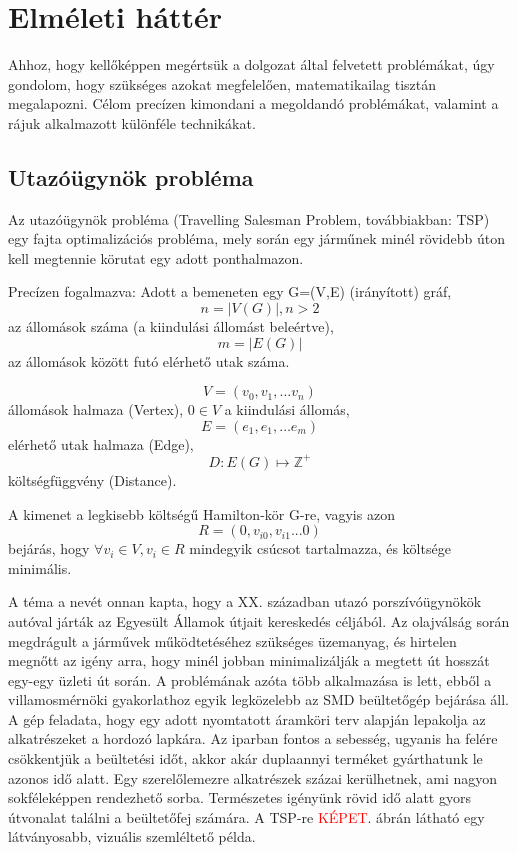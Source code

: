 \chapter{Elméleti háttér}

Ahhoz, hogy kellőképpen megértsük a dolgozat által felvetett problémákat, úgy gondolom, hogy szükséges azokat megfelelően, matematikailag tisztán megalapozni. Célom precízen kimondani a megoldandó problémákat, valamint a rájuk alkalmazott különféle technikákat.

\section{Utazóügynök probléma \cite{alg_optim}}
Az utazóügynök probléma (Travelling Salesman Problem, továbbiakban: TSP)  egy fajta optimalizációs probléma, mely során egy járműnek minél rövidebb úton kell megtennie körutat egy adott ponthalmazon. 

Precízen fogalmazva: Adott a bemeneten egy G=(V,E) (irányított) gráf, \[n = |V(G)|, n > 2 \] az állomások száma (a kiindulási állomást beleértve),  \[m = |E(G)| \] az állomások között futó elérhető utak száma.

\[ V = (v_0,v_1, \dots v_n )\]  állomások halmaza (Vertex), \(0 \in V\) a kiindulási állomás,
\[ E = (e_1,e_1, \dots e_m)\] elérhető utak halmaza (Edge),
\[ D : E(G) \mapsto \mathbb{Z}^+\] költségfüggvény (Distance).

A kimenet a legkisebb költségű Hamilton-kör G-re, vagyis azon 
\[ R = (0, v_{i0}, v_{i1} ... 0) \]
bejárás, hogy \( \forall v_i \in V, v_i \in R \) mindegyik csúcsot tartalmazza, és költsége minimális.

A téma a nevét onnan kapta, hogy a XX. században utazó porszívóügynökök autóval járták az Egyesült Államok útjait kereskedés céljából. Az olajválság során megdrágult a járművek működtetéséhez szükséges üzemanyag, és hirtelen megnőtt az igény arra, hogy minél jobban minimalizálják a megtett út hosszát egy-egy üzleti út során. A problémának azóta több alkalmazása is lett, ebből a villamosmérnöki gyakorlathoz egyik legközelebb az SMD beültetőgép bejárása áll. A gép feladata, hogy egy adott nyomtatott áramköri terv alapján lepakolja az alkatrészeket a hordozó lapkára. Az iparban fontos a sebesség, ugyanis ha felére csökkentjük a beültetési időt, akkor akár duplaannyi terméket gyárthatunk le azonos idő alatt. Egy szerelőlemezre alkatrészek százai kerülhetnek, ami nagyon sokféleképpen rendezhető sorba. Természetes igényünk  rövid idő alatt gyors útvonalat találni a beültetőfej számára. A TSP-re \textcolor{red}{KÉPET}. ábrán látható egy látványosabb, vizuális szemléltető példa.

